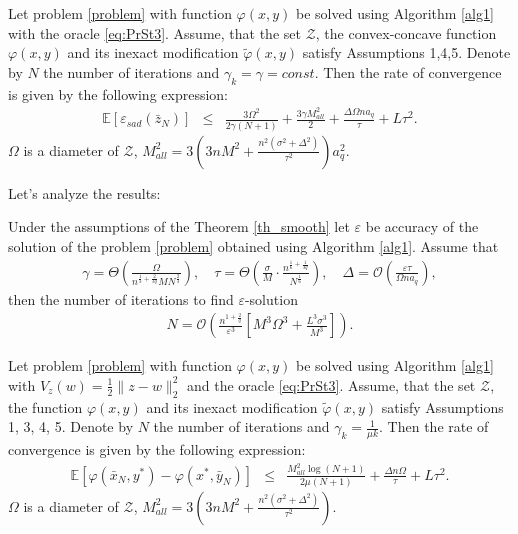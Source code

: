 \documentclass[runningheads]{llncs}
\newcommand{\EE}{\mathbf{E}}
\def\EE{\mathbb E}
\begin{document}
\begin{theorem} \label{th_smooth}
Let problem \eqref{problem} with function $\varphi(x,y)$ be solved using Algorithm \ref{alg1} with the oracle \eqref{eq:PrSt3}. Assume, that the set $\mathcal{Z}$, the convex-concave function  $\varphi(x,y)$ and its inexact modification $\widetilde{\varphi}(x,y)$ satisfy Assumptions 1,4,5. Denote by $N$ the number of iterations and $\gamma_k = \gamma =const$. Then the rate of convergence is given by the following expression:
\begin{eqnarray*}
    \mathbb{E}\left[\varepsilon_{sad}(\bar z_{N})\right] &\leq&
    \frac{3\Omega^2}{2 \gamma (N+1)} + \frac{3\gamma M^2_{all}}{2} + \frac{\Delta \Omega n a_q}{\tau} + L\tau^2.
\end{eqnarray*} 
$\Omega$ is a diameter of $\mathcal{Z}$, $M^2_{all} = 3\left(3n M^2 +\frac{n^2(\sigma^2 + \Delta^2)}{\tau^2}\right)a^2_q$.
\end{theorem}


Let's analyze the results:
\begin{corollary} Under the assumptions of the Theorem \ref{th_smooth} let $\varepsilon$ be accuracy of the solution of the problem \eqref{problem} obtained using Algorithm \ref{alg1}. Assume that
\begin{eqnarray}
    \gamma = \Theta \left(\frac{\Omega}{n^{\frac{1}{3} + \frac{2}{3q}} M N^{\frac{2}{3}}}\right), \quad \tau = \Theta \left( \frac{\sigma}{M} \cdot \frac{n^{\frac{1}{6} + \frac{1}{3q}}}{N^{\frac{1}{6}}}\right),\quad \Delta = \mathcal{O} \left(\frac{\varepsilon \tau}{\Omega n a_q}\right),
\end{eqnarray}
then the number of iterations to find $\varepsilon$-solution
\begin{eqnarray*}
    N = \mathcal{O} \left( \frac{n^{1 + \frac{2}{q}}}{\varepsilon^3} \left[M^3\Omega^3 + \frac{L^3 \sigma^3}{M^3}\right]\right).
\end{eqnarray*}
\end{corollary}




\begin{theorem}\label{th_smooth_strong}
Let problem \eqref{problem} with function $\varphi(x,y)$ be solved using Algorithm \ref{alg1} with $V_z(w) = \frac{1}{2}\|z-w\|^2_2$ and the oracle \eqref{eq:PrSt3}. Assume, that the set $\mathcal{Z}$, the function  $\varphi(x,y)$ and its inexact modification $\widetilde{\varphi}(x,y)$ satisfy Assumptions 1, 3, 4, 5. Denote by $N$ the number of iterations and $\gamma_k = \frac{1}{\mu k}$. Then the rate of convergence is given by the following expression:
\begin{eqnarray*}
\EE\left[\varphi(\bar x_N, y^*) - \varphi(x^*, \bar y_N)\right]
    &\leq& \frac{M^2_{all} \log (N+1)}{2 \mu (N+1)} + \frac{\Delta n\Omega}{\tau} + L\tau^2.
\end{eqnarray*}
$\Omega$ is a diameter of $\mathcal{Z}$, $M^2_{all} = 3\left(3n M^2 +\frac{n^2(\sigma^2 + \Delta^2)}{\tau^2}\right)$.
\end{theorem}
\end{document}
